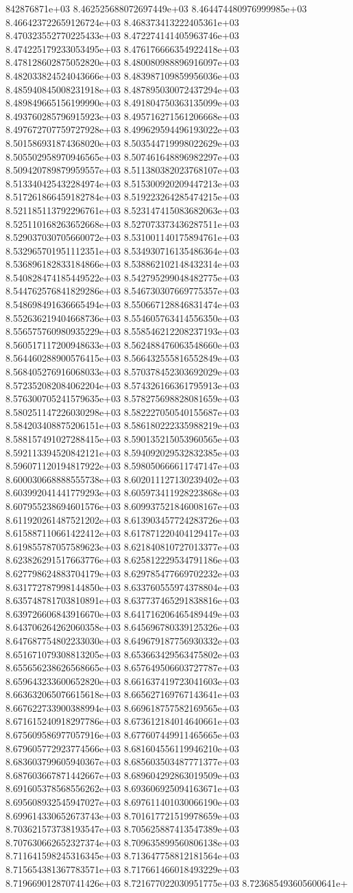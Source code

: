 842876871e+03	8.462525688072697449e+03	8.464474480976999985e+03	8.466423722659126724e+03	8.468373413222405361e+03	8.470323552770225433e+03	8.472274141405963746e+03	8.474225179233053495e+03	8.476176666354922418e+03	8.478128602875052820e+03	8.480080988896916097e+03	8.482033824524043666e+03	8.483987109859956036e+03	8.485940845008231918e+03	8.487895030072437294e+03	8.489849665156199990e+03	8.491804750363135099e+03	8.493760285796915923e+03	8.495716271561206668e+03	8.497672707759727928e+03	8.499629594496193022e+03	8.501586931874368020e+03	8.503544719998022629e+03	8.505502958970946565e+03	8.507461648896982297e+03	8.509420789879959557e+03	8.511380382023768107e+03	8.513340425432284974e+03	8.515300920209447213e+03	8.517261866459182784e+03	8.519223264285474215e+03	8.521185113792296761e+03	8.523147415083682063e+03	8.525110168263652668e+03	8.527073373436287511e+03	8.529037030705660072e+03	8.531001140175894761e+03	8.532965701951112351e+03	8.534930716135486364e+03	8.536896182833184866e+03	8.538862102148432314e+03	8.540828474185449522e+03	8.542795299048482775e+03	8.544762576841829286e+03	8.546730307669775357e+03	8.548698491636665494e+03	8.550667128846831474e+03	8.552636219404668736e+03	8.554605763414556350e+03	8.556575760980935229e+03	8.558546212208237193e+03	8.560517117200948633e+03	8.562488476063548660e+03	8.564460288900576415e+03	8.566432555816552849e+03	8.568405276916068033e+03	8.570378452303692029e+03	8.572352082084062204e+03	8.574326166361795913e+03	8.576300705241579635e+03	8.578275698828081659e+03	8.580251147226030298e+03	8.582227050540155687e+03	8.584203408875206151e+03	8.586180222335988219e+03	8.588157491027288415e+03	8.590135215053960565e+03	8.592113394520842121e+03	8.594092029532832385e+03	8.596071120194817922e+03	8.598050666611747147e+03	8.600030668888555738e+03	8.602011127130239402e+03	8.603992041441779293e+03	8.605973411928223868e+03	8.607955238694601576e+03	8.609937521846008167e+03	8.611920261487521202e+03	8.613903457724283726e+03	8.615887110661422412e+03	8.617871220404129417e+03	8.619855787057589623e+03	8.621840810727013377e+03	8.623826291517663776e+03	8.625812229534791186e+03	8.627798624883704179e+03	8.629785477669702232e+03	8.631772787998144850e+03	8.633760555974378804e+03	8.635748781703810891e+03	8.637737465291838816e+03	8.639726606843916670e+03	8.641716206465489449e+03	8.643706264262060358e+03	8.645696780339125326e+03	8.647687754802233030e+03	8.649679187756930332e+03	8.651671079308813205e+03	8.653663429563475802e+03	8.655656238626568665e+03	8.657649506603727787e+03	8.659643233600652820e+03	8.661637419723041603e+03	8.663632065076615618e+03	8.665627169767143641e+03	8.667622733900388994e+03	8.669618757582169565e+03	8.671615240918297786e+03	8.673612184014640661e+03	8.675609586977057916e+03	8.677607449911465665e+03	8.679605772923774566e+03	8.681604556119946210e+03	8.683603799605940367e+03	8.685603503487771377e+03	8.687603667871442667e+03	8.689604292863019509e+03	8.691605378568556262e+03	8.693606925094163671e+03	8.695608932545947027e+03	8.697611401030066190e+03	8.699614330652673743e+03	8.701617721519978659e+03	8.703621573738193547e+03	8.705625887413547389e+03	8.707630662652327374e+03	8.709635899560806138e+03	8.711641598245316345e+03	8.713647758812181564e+03	8.715654381367783571e+03	8.717661466018493229e+03	8.719669012870741426e+03	8.721677022030951775e+03	8.723685493605600641e+